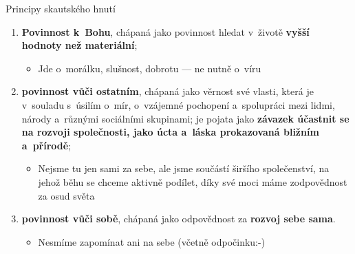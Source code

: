 \documentclass[hyperref={bookmarks=true, unicode=true, colorlinks=true, plainpages=false, pdfkeywords={Skaut, Junak, Skauting, Vychovna metoda}, linkcolor=OrangeRed, anchorcolor=OrangeRed, citecolor=RawSienna, filecolor=RawSienna, menucolor=OrangeRed, urlcolor=RawSienna, pdftex}, compress, xelatex, xcolor=dvipsnames, print]{beamer}
\begin{document}
\begin{frame}{Principy skautského hnutí}
\begin{enumerate}
\item \textbf{Povinnost k~Bohu}, chápaná jako povinnost hledat v~životě \textbf{vyšší hodnoty než materiální};
 \begin{itemize}
 \item Jde o~morálku, slušnost, dobrotu --- ne nutně o~víru
 \end{itemize}
\item \textbf{povinnost vůči ostatním}, chápaná jako věrnost své vlasti, která je v~souladu s~úsilím o~mír, o~vzájemné pochopení a~spolupráci mezi lidmi, národy a~různými sociálními skupinami; je pojata jako \textbf{závazek účastnit se na rozvoji společnosti, jako úcta a~láska prokazovaná bližním a~přírodě};
 \begin{itemize}
 \item Nejsme tu jen sami za sebe, ale jsme součástí širšího společenství, na jehož běhu se chceme aktivně podílet, díky své moci máme zodpovědnost za osud světa
 \end{itemize}
\item \textbf{povinnost vůči sobě}, chápaná jako odpovědnost za \textbf{rozvoj sebe sama}.
 \begin{itemize}
 \item Nesmíme zapomínat ani na sebe (včetně odpočinku:-)
 \end{itemize}
\end{enumerate}
\end{frame}
\end{document}
